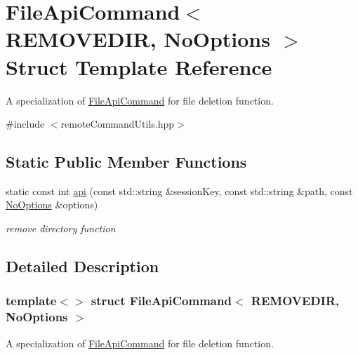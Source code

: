 \hypertarget{structFileApiCommand_3_01REMOVEDIR_00_01NoOptions_01_4}{
\section{FileApiCommand$<$ REMOVEDIR, NoOptions $>$ Struct Template Reference}
\label{structFileApiCommand_3_01REMOVEDIR_00_01NoOptions_01_4}
}


A specialization of \hyperlink{structFileApiCommand}{FileApiCommand} for file deletion function.  




{\ttfamily \#include $<$remoteCommandUtils.hpp$>$}

\subsection*{Static Public Member Functions}
\begin{DoxyCompactItemize}
\item 
static const int \hyperlink{structFileApiCommand_3_01REMOVEDIR_00_01NoOptions_01_4_a5e9ad24980e669ce54f3baa0afa67126}{api} (const std::string \&sessionKey, const std::string \&path, const \hyperlink{structNoOptions}{NoOptions} \&options)
\begin{DoxyCompactList}\small\item\em remove directory function \item\end{DoxyCompactList}\end{DoxyCompactItemize}


\subsection{Detailed Description}
\subsubsection*{template$<$$>$ struct FileApiCommand$<$ REMOVEDIR, NoOptions $>$}

A specialization of \hyperlink{structFileApiCommand}{FileApiCommand} for file deletion function. 

